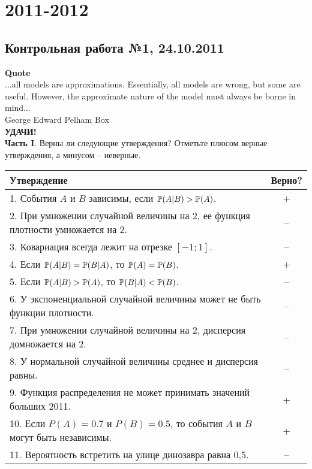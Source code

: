 \documentclass[pdftex,12pt,a4paper]{article}
\begin{document}
\section{2011-2012}

\subsection{Контрольная работа №1, 24.10.2011}

\textbf{Quote}\\
...all models are approximations. Essentially, all models are wrong, but some are useful. However, the approximate nature of the model must always be borne in mind...\\
George Edward Pelham Box\\

\textbf{УДАЧИ!} \\ 

\textbf{Часть I}. Верны ли следующие утверждения? Отметьте плюсом верные утверждения, а минусом -- неверные. \\

\renewcommand\arraystretch{2.0}

\begin{tabular}{|p{15cm}|c|}
\hline 
Утверждение & Верно? \\ 
\hline 
1. События $A$ и $B$ зависимы, если $\P(A|B)>\P(A)$.  &  + \\ 
\hline 
2. При умножении случайной величины на 2, ее функция плотности умножается на 2. & -- \\ 
\hline 
3. Ковариация всегда лежит на отрезке $[-1;1]$. &  -- \\ 
\hline 
4. Если $\P(A|B)=\P(B|A)$, то $\P(A)=\P(B)$. & + \\ 
\hline 
5. Если $\P(A|B)>\P(A)$, то $\P(B|A)<\P(B)$. & -- \\ 
\hline 
6. У экспоненциальной случайной величины может не быть функции плотности. &  -- \\ 
\hline 
7. При умножении случайной величины на 2, дисперсия домножается на 2. & -- \\
\hline 
8. У нормальной случайной величины среднее и дисперсия равны. &  -- \\ 
\hline 
9. Функция распределения не может принимать значений больших 2011. & + \\ 
\hline 
10. Если $P(A)=0.7$ и $P(B)=0.5$, то события $A$ и $B$ могут быть независимы. & + \\ 
\hline 
11. Вероятность встретить на улице динозавра равна 0{,}5. & -- \\ 
\hline 
\end{tabular} 
\end{document}
